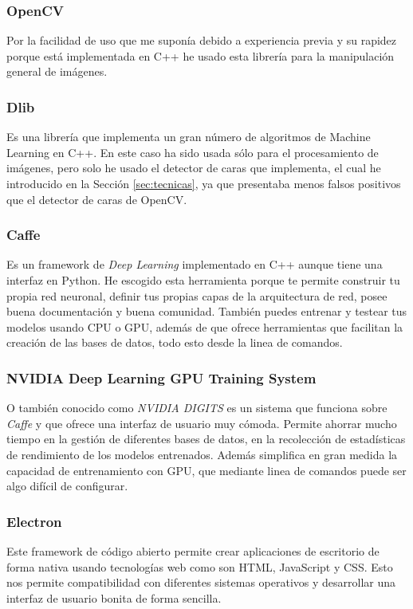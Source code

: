 \documentclass[a4paper,11pt]{book}
\begin{document}
\subsubsection{OpenCV \cite{opencv}}\label{sub:opencv}
Por la facilidad de uso que me suponía debido a experiencia previa y su rapidez porque está implementada en C++ he usado esta librería para la manipulación general de imágenes.
\subsubsection{Dlib \cite{dlib}}\label{sub:dlib}
Es una librería que implementa un gran número de algoritmos de Machine Learning en C++. En este caso ha sido usada sólo para el procesamiento de imágenes, pero solo he usado el detector de caras que implementa, el cual he introducido en la Sección \ref{sec:tecnicas}, ya que presentaba menos falsos positivos que el detector de caras de OpenCV\cite{king14}.
\subsubsection{Caffe \cite{caffe}}\label{sub:caffe}
Es un framework de \textit{Deep Learning} implementado en C++ aunque tiene una interfaz en Python. He escogido esta herramienta porque te permite construir tu propia red neuronal, definir tus propias capas de la arquitectura de red, posee buena documentación y buena comunidad. También puedes entrenar y testear tus modelos usando CPU o GPU, además de que ofrece herramientas que facilitan la creación de las bases de datos, todo esto desde la linea de comandos.
\subsubsection{NVIDIA Deep Learning GPU Training System \cite{digits}}\label{sub:digits}
O también conocido como \textit{NVIDIA DIGITS} es un sistema que funciona sobre \textit{Caffe} y que ofrece una interfaz de usuario muy cómoda. Permite ahorrar mucho tiempo en la gestión de diferentes bases de datos, en la recolección de estadísticas de rendimiento de los modelos entrenados. Además simplifica en gran medida la capacidad de entrenamiento con GPU, que mediante linea de comandos puede ser algo difícil de configurar.
\subsubsection{Electron \cite{electron}}\label{sub:electron}
Este framework de código abierto permite crear aplicaciones de escritorio de forma nativa usando tecnologías web como son HTML, JavaScript y CSS. Esto nos permite compatibilidad con diferentes sistemas operativos y desarrollar una interfaz de usuario bonita de forma sencilla.
\end{document}
